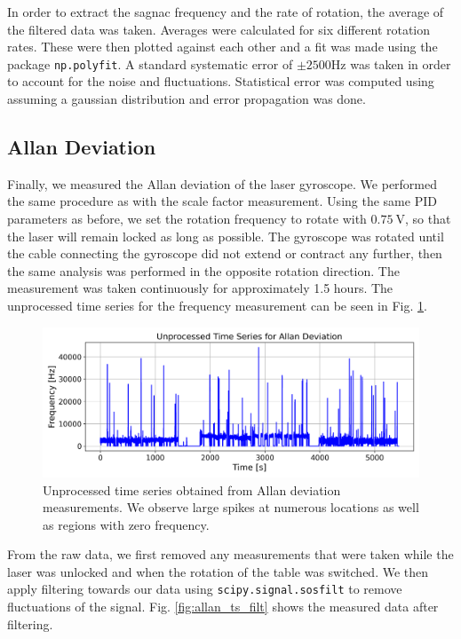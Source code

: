 \documentclass[a4paper]{report}
\numberwithin{equation}{section}
\begin{document}
In order to extract the sagnac frequency and the rate of rotation, the average of the filtered data was taken. Averages were calculated for six different rotation rates. These were then plotted against each other and a fit was made using the package \texttt{np.polyfit}. A standard systematic error of $\pm 2500 \text{Hz}$ was taken in order to account for the noise and fluctuations. Statistical error was computed using assuming a gaussian distribution and error propagation was done. 


\subsection{Allan Deviation}

Finally, we measured the Allan deviation of the laser gyroscope. We performed the same procedure as with the scale factor measurement. 
Using the same PID parameters as before, we set the rotation frequency to rotate with $\SI{0.75}{\volt}$, so that the laser will 
remain locked as long as possible. The gyroscope was rotated until the cable connecting the gyroscope did not extend or contract
any further, then the same analysis was performed in the opposite rotation direction. The measurement was taken continuously for 
approximately 1.5 hours. The unprocessed time series for the frequency measurement can be seen in Fig. \ref{fig:allan_ts_raw}. \par 


\begin{figure}[h!]
	\centering
	\includegraphics[width=0.8\columnwidth]{allan_ts_raw.png}
	\caption{Unprocessed time series obtained from Allan deviation measurements. We observe large
			spikes at numerous locations as well as regions with zero frequency.}
	\label{fig:allan_ts_raw}
\end{figure}

From the raw data, we first removed any measurements that were taken while the laser was unlocked and when the 
rotation of the table was switched. We then apply filtering towards our data using \texttt{scipy.signal.sosfilt} to remove
fluctuations of the signal. Fig. \ref{fig:allan_ts_filt} shows the measured data after filtering. \par 
\end{document}
